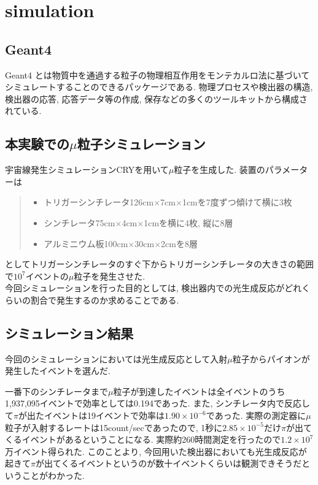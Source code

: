 \chapter{simulation}\label{simulation}
\section{Geant4}
Geant4 とは物質中を通過する粒子の物理相互作用をモンテカルロ法に基づいてシミュレートすることのできるパッケージである.
物理プロセスや検出器の構造, 検出器の応答, 応答データ等の作成, 保存などの多くのツールキットから構成されている.

\section{本実験での$\mu$粒子シミュレーション}
宇宙線発生シミュレーションCRYを用いて$\mu$粒子を生成した.
装置のパラメーターは
\begin{quote}
    \begin{itemize}
        \item トリガーシンチレータ126cm$\times$7cm$\times$1cmを7度ずつ傾けて横に3枚
        \item シンチレータ75cm$\times$4cm$\times$1cmを横に4枚, 縦に8層
        \item アルミニウム板100cm$\times$30cm$\times$2cmを8層
    \end{itemize}
\end{quote}
としてトリガーシンチレータのすぐ下からトリガーシンチレータの大きさの範囲で$10^{7}$イベントの$\mu$粒子を発生させた.
\\
今回シミュレーションを行った目的としては, 検出器内での光生成反応がどれくらいの割合で発生するのか求めることである.

\section{シミュレーション結果}
今回のシミュレーションにおいては光生成反応として入射$\mu$粒子からパイオンが発生したイベントを選んだ.

一番下のシンチレータまで$\mu$粒子が到達したイベントは全イベントのうち1,937,095イベントで効率としては0.194であった.
また, シンチレータ内で反応して$\pi$が出たイベントは19イベントで効率は$1.90 \times10^{-6}$であった.
実際の測定器に$\mu$粒子が入射するレートは15count/secであったので, 1秒に$2.85 \times10^{-5}$だけ$\pi$が出てくるイベントがあるということになる.
実際約260時間測定を行ったので$1.2 \times10^{7}$万イベント得られた.
このことより, 今回用いた検出器においても光生成反応が起きて$\pi$が出てくるイベントというのが数十イベントくらいは観測できそうだということがわかった.


